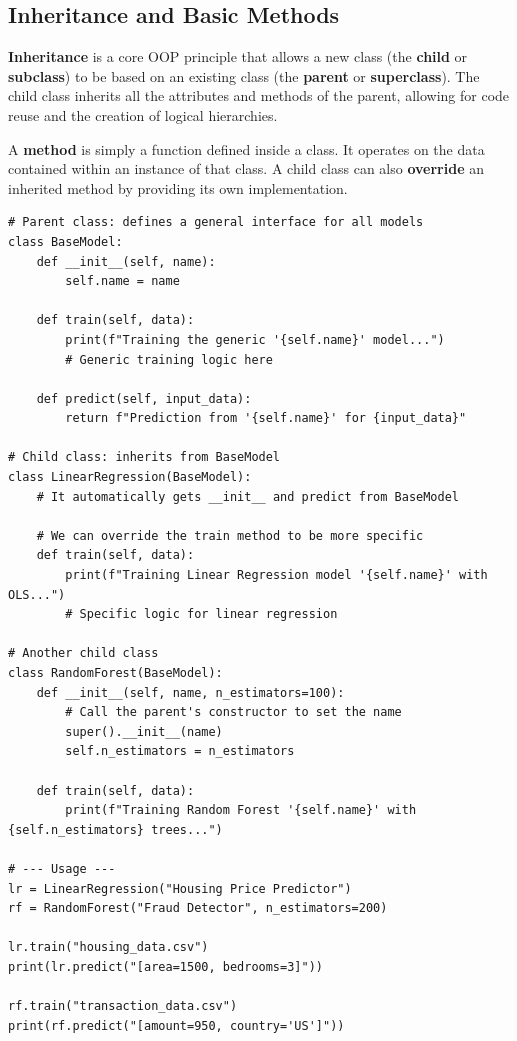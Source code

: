 \subsection{Inheritance and Basic Methods}
\label{subsec:inheritance}
\textbf{Inheritance} is a core OOP principle that allows a new class (the \textbf{child} or \textbf{subclass}) to be based on an existing class (the \textbf{parent} or \textbf{superclass}). The child class inherits all the attributes and methods of the parent, allowing for code reuse and the creation of logical hierarchies.

A \textbf{method} is simply a function defined inside a class. It operates on the data contained within an instance of that class. A child class can also \textbf{override} an inherited method by providing its own implementation.

\begin{example}
\text{ }\begin{verbatim}
# Parent class: defines a general interface for all models
class BaseModel:
    def __init__(self, name):
        self.name = name

    def train(self, data):
        print(f"Training the generic '{self.name}' model...")
        # Generic training logic here
    
    def predict(self, input_data):
        return f"Prediction from '{self.name}' for {input_data}"

# Child class: inherits from BaseModel
class LinearRegression(BaseModel):
    # It automatically gets __init__ and predict from BaseModel
    
    # We can override the train method to be more specific
    def train(self, data):
        print(f"Training Linear Regression model '{self.name}' with OLS...")
        # Specific logic for linear regression

# Another child class
class RandomForest(BaseModel):
    def __init__(self, name, n_estimators=100):
        # Call the parent's constructor to set the name
        super().__init__(name)
        self.n_estimators = n_estimators
    
    def train(self, data):
        print(f"Training Random Forest '{self.name}' with {self.n_estimators} trees...")

# --- Usage ---
lr = LinearRegression("Housing Price Predictor")
rf = RandomForest("Fraud Detector", n_estimators=200)

lr.train("housing_data.csv")
print(lr.predict("[area=1500, bedrooms=3]"))

rf.train("transaction_data.csv")
print(rf.predict("[amount=950, country='US']"))
\end{verbatim}
\end{example}

